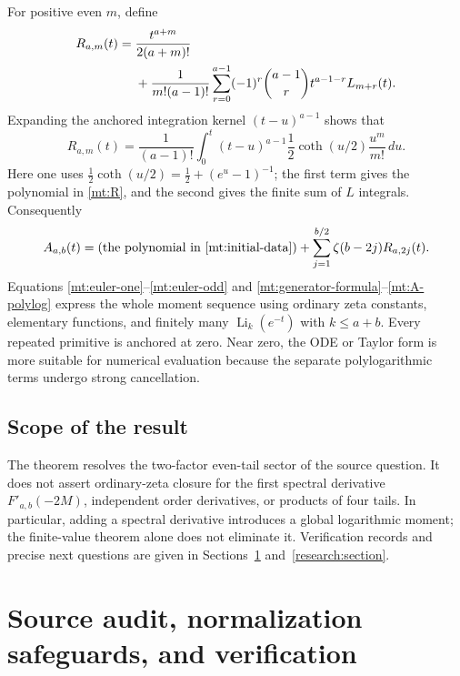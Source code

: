 \documentclass[11pt,letterpaper]{article}
\numberwithin{equation}{section}
\theoremstyle{plain}
\theoremstyle{definition}
\theoremstyle{remark}
\begin{document}
For positive even $m$, define
\begin{align}
 R_{a,m}(t)={}&\frac{t^{a+m}}{2(a+m)!}
 \notag\\
 &+\frac1{m!(a-1)!}\sum_{r=0}^{a-1}(-1)^r\binom{a-1}{r}
                                  t^{a-1-r}L_{m+r}(t).
 \label{mt:R}
\end{align}
Expanding the anchored integration kernel $(t-u)^{a-1}$ shows that
\begin{equation}\label{mt:R-integral}
 R_{a,m}(t)=\frac1{(a-1)!}\int_0^t(t-u)^{a-1}
                         \frac12\coth(u/2)\frac{u^m}{m!}\,du.
\end{equation}
Here one uses $\tfrac12\coth(u/2)=\tfrac12+(e^u-1)^{-1}$;
the first term gives the polynomial in \eqref{mt:R}, and the second
gives the finite sum of $L$ integrals. Consequently
\begin{equation}\label{mt:A-polylog}
 A_{a,b}(t)=(\text{the polynomial in \eqref{mt:initial-data}})
              +\sum_{j=1}^{b/2}\zeta(b-2j)R_{a,2j}(t).
\end{equation}
Equations \eqref{mt:euler-one}--\eqref{mt:euler-odd} and
\eqref{mt:generator-formula}--\eqref{mt:A-polylog} express the whole
moment sequence using ordinary zeta constants, elementary functions,
and finitely many $\operatorname{Li}_k(e^{-t})$ with $k\le a+b$.
Every repeated primitive is anchored at zero. Near zero, the ODE or
Taylor form is more suitable for numerical evaluation because the
separate polylogarithmic terms undergo strong cancellation.

\subsection{Scope of the result}

The theorem resolves the two-factor even-tail sector of the source
question. It does not assert ordinary-zeta closure for the first
spectral derivative $F'_{a,b}(-2M)$, independent order derivatives,
or products of four tails. In particular, adding a spectral derivative
introduces a global logarithmic moment; the finite-value theorem alone
does not eliminate it. Verification records and precise next questions
are given in Sections~\ref{audit:section} and~\ref{research:section}.


\section{Source audit, normalization safeguards, and verification}
\label{audit:section}
\end{document}

